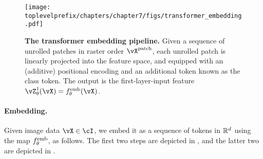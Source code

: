 \documentclass[../../book-main.tex]{subfiles}
\begin{document}
\begin{figure}
    \centering 
    \texttt{[image: \\toplevelprefix/chapters/chapter7/figs/transformer\_embedding.pdf]}
    \caption{\small\textbf{The transformer embedding pipeline.} Given a sequence of unrolled patches in raster order \(\vX^{\patch}\), each unrolled patch is linearly projected into the feature space, and equipped with an (additive) positional encoding and an additional token known as the class token. The output is the first-layer-input feature \(\vZ_{\theta}^{1}(\vX) = f_{\theta}^{\emb}(\vX)\).}
    \label{fig:transformer_embedding}
\end{figure}

\paragraph{Embedding.} Given image data \(\vX \in \cI\), we embed it as a sequence of tokens in \(\mathbb{R}^{d}\) using the map \(f_{\theta}^{\mathrm{emb}}\), as follows. The first two steps are depicted in , and the latter two are depicted in .
\end{document}
